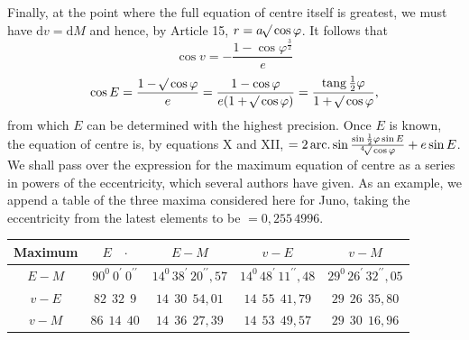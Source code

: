 Finally, at the point where the full equation of centre itself is greatest, we must have $\mathrm{d}v=\mathrm{d}M$ and hence, by Article 15, $r=a\BareRoot{\cos\varphi}$. It follows that
\[
\cos v=-\frac{1-\cos\varphi^{\frac{3}{2}}}{e}
\]
\[
\cos E=\frac{1-\BareRoot{\cos\varphi}}{e}=\frac{1-\cos\varphi}{e(1+\BareRoot{\cos\varphi})}=\frac{\operatorname{tang}\frac{1}{2}\varphi}{1+\BareRoot{\cos\varphi}},
\]
from which $E$ can be determined with the highest precision. Once $E$ is known, the equation of centre is, by equations X and XII, $=2\operatorname{arc.}\sin\frac{\sin\frac{1}{2}\varphi\sin E}{\BareRoot[4]{\cos\varphi}}+e\sin E$\HistoricalNoteEight{Manuscript note:] $\sin E=\BareRoot{\frac{\cos\varphi+2\BareRoot{\cos\varphi}+\cos\varphi^{\frac{3}{2}}}{(1+\BareRoot{\cos\varphi})(1+\cos\varphi)}},$ Equation of centre $=2\operatorname{arc.}\sin\BareRoot{\left(\frac{1}{1+\cos\varphi}-\frac{\BareRoot[4]{(1-e e)}}{2}\right)}+e\sin E=\operatorname{arc.}\cos\frac{-1+\BareRoot{\cos\varphi}+\cos\varphi+\cos\varphi^{\frac{3}{2}}}{1+\cos\varphi}+e\sin E=\operatorname{arc.}\sin(\operatorname{tg}\frac{1}{2}\varphi^2\operatorname{tg}E)+e\sin E.$}. We shall pass over the expression for the maximum equation of centre as a series in powers of the eccentricity, which several authors have given. As an example, we append a table of the three maxima considered here for Juno, taking the eccentricity from the latest elements to be $=0{,}255\,4996$.
\begin{center}
\footnotesize
\setlength{\tabcolsep}{3pt}
\renewcommand{\arraystretch}{1.3}
\begin{tabular}{|c|c|c|c|c|}
\hline
Maximum & $E\quad\text{·}$ & $E-M$ & $v-E$ & $v-M$\\
\hline
$E-M$ & $90^0\ 0^{\prime}\ 0^{\prime\prime}$ & $14^0\,38^{\prime}\,20^{\prime\prime}{,}57$ & $14^0\,48^{\prime}\,11^{\prime\prime}{,}48$ & $29^0\,26^{\prime}\,32^{\prime\prime}{,}05$\\
$v-E$ & $82\ \ 32\ \ 9$ & $14\ \ 30\ \ 54{,}01$ & $14\ \ 55\ \ 41{,}79$ & $29\ \ 26\ \ 35{,}80$\\
$v-M$ & $86\ \ 14\ \ 40$ & $14\ \ 36\ \ 27{,}39$ & $14\ \ 53\ \ 49{,}57$ & $29\ \ 30\ \ 16{,}96$\\
\hline
\end{tabular}
\end{center}
